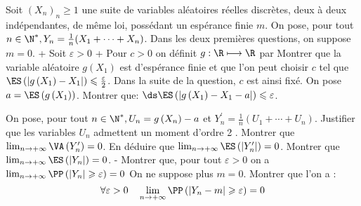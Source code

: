 \begin{exercise}[title=Loi faible des grands nombres dans $L_{1}$ ]
Soit $\left(X_{n}\right)_{n} \geqslant 1$ une suite de variables aléatoires réelles discrètes, deux à deux indépendantes, de même loi, possédant un espérance finie $m$. On pose, pour tout $n \in \N^{*}, Y_{n}=\frac1n(X_{1}+\cdots+X_{n})$.
Dans les deux premières questions, on suppose $m=0$.
\question+ Soit $\varepsilon>0$
\question+ Pour $c>0$ on définit $g: \R \longmapsto \R$ par 
Montrer que la variable aléatoire $g\left(X_{1}\right)$ est d'espérance finie et que l'on peut choisir $c$ tel que $\ES\left(\left|g\left(X_{1}\right)-X_{1}\right|\right) \leqslant \frac{\varepsilon}{2}$.
Dans la suite de la question, $c$ est ainsi fixé.
\question On pose $a=\ES\left(g\left(X_{1}\right)\right)$. Montrer que:
$\ds\ES\left(\left|g\left(X_{1}\right)-X_{1}-a\right|\right) \leqslant \varepsilon$.

\question On pose, pour tout $n \in \N^{*}, U_{n}=g\left(X_{n}\right)-a$ et $Y_{n}^{\prime}=\frac1n(U_{1}+\cdots+U_{n})$.
Justifier que les variables $U_{n}$ admettent un moment d'ordre 2 . Montrer que $\lim _{n \rightarrow+\infty} \VA\left(Y_{n}^{\prime}\right)=0$.
En déduire que $\lim _{n \rightarrow+\infty} \ES\left(|Y_{n}^{\prime}|\right)=0$.
\question Montrer que $\lim _{n \rightarrow+\infty} \ES\left(\left|Y_{n}\right|\right)=0$.
\question- Montrer que, pour tout $\varepsilon>0$ on a $\lim _{n \rightarrow+\infty} \PP\left(\left|Y_{n}\right| \geqslant \varepsilon\right)=0$
\question On ne suppose plus $m=0$. Montrer que l'on a :
\begin{equation*}
\forall \varepsilon>0 \quad \lim _{n \rightarrow+\infty} \PP\left(\left|Y_{n}-m\right| \geqslant \varepsilon\right)=0
\end{equation*}
\endquestions 
\end{exercise}


